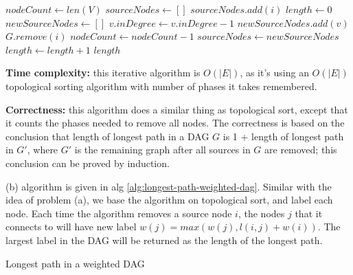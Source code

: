 \documentclass{article}
\begin{document}
\begin{description}
\begin{algorithm}[h]
\begin{algorithmic}[1]
      \State $nodeCount \gets len(V)$
      \State $sourceNodes \gets []$
          \State $sourceNodes.add(i)$
        \EndIf
      \EndFor
      \State $length \gets 0$
        \State $newSourceNodes \gets []$
            \State $v.inDegree \gets v.inDegree - 1$
              \State $newSourceNodes.add(v)$
            \EndIf
          \EndFor
          \State $G.remove(i)$
          \State $nodeCount \gets nodeCount - 1$
        \EndFor
        \State $sourceNodes \gets newSourceNodes$
        \State $length \gets length + 1$
      \EndWhile
      \State \Return $length$
    \EndFunction
    
    \end{algorithmic}
  \end{algorithm}

  \textbf{Time complexity:} this iterative algorithm is $O(|E|)$, as it's using an $O(|E|)$ topological sorting algorithm with number of phases it takes remembered. 

  \textbf{Correctness:} this algorithm does a similar thing as topological sort, except that it counts the phases needed to remove all nodes. The correctness is based on the conclusion that length of longest path in a DAG $G$ is 1 + length of longest path in $G'$, where $G'$ is the remaining graph after all sources in $G$ are removed; this conclusion can be proved by induction. 

  (b) algorithm is given in alg \ref{alg:longest-path-weighted-dag}. Similar with the idea of problem (a), we base the algorithm on topological sort, and label each node. Each time the algorithm removes a source node $i$, the nodes $j$ that it connects to will have new label $w(j) = max(w(j), l(i,j) + w(i))$. The largest label in the DAG will be returned as the length of the longest path.

  \begin{algorithm}[h]
  \caption{Longest path in a weighted DAG}
  \label{alg:longest-path-weighted-DAG}
    \begin{algorithmic}[1]
  

\end{algorithmic}
\end{algorithm}
\end{description}
\end{document}
